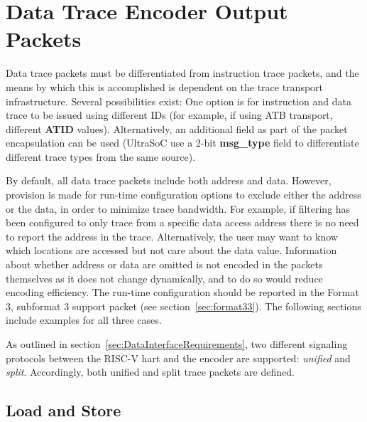 \chapter{Data Trace Encoder Output Packets} \label{dataTracePackets}

Data trace packets must be differentiated from instruction trace packets, and the means by which
this is accomplished is dependent on the trace transport infrastructure.  Several possibilities exist:
One option is for instruction and data trace to be issued using different IDs (for example, if using ATB transport,
different \textbf{ATID} values).  Alternatively, an additional field as part of the packet encapsulation can be 
used (UltraSoC use a 2-bit \textbf{msg\_type} field to differentiate different trace types from the same source).

By default, all data trace packets include both address and data.  However, provision is made for run-time 
configuration options to exclude either the address or the data, in order to minimize trace bandwidth.  For example,
if filtering has been configured to only trace from a specific data access address there is no need to report
the address in the trace.  Alternatively, the user may want to know which locations are accessed but not care 
about the data value. Information about whether address or data are omitted is not encoded in the packets
themselves as it does not change dynamically, and to do so would reduce encoding efficiency.  The run-time
configuration should be reported in the Format 3, subformat 3 support packet (see section~\ref{sec:format33}).
The following sections include examples for all three cases.

As outlined in section~\ref{sec:DataInterfaceRequirements}, two different signaling protocols
between the RISC-V hart and the encoder are supported: \textit{unified} and \textit{split}.
Accordingly, both unified and split trace packets are defined.

\section{Load and Store} \label{sec:data-loadstore}


